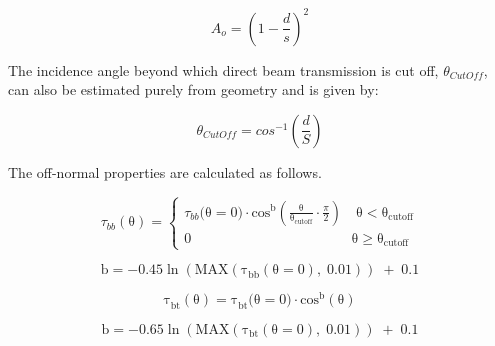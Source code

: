 {\begin{equation}
{A_o} = {\left( {1 - {\frac{d}{s}}} \right)^2}
\end{equation}

The incidence angle beyond which direct beam transmission is cut off, {$\theta$}\(_{CutOff}\), can also be estimated purely from geometry and is given by:

\begin{equation}
{\theta_{CutOff}} = co{s^{ - 1}}\left( {{\frac{d}{S}}} \right)
\end{equation}

The off-normal properties are calculated as follows.

\begin{equation}
{\tau_{bb}}\left( {\mathrm{\theta }} \right) = \left\{ \begin{array}{l}{\tau_{bb}}{\mathrm{(\theta }} = {\mathrm{0)}} \cdot {\mathrm{co}}{{\mathrm{s}}^{\mathrm{b}}}\left( {\frac{{\mathrm{\theta }}}{{{{\mathrm{\theta }}_{{\mathrm{cutoff}}}}}} \cdot \frac{\pi }{{\mathrm{2}}}} \right)\quad {\mathrm{\theta }} < {{\mathrm{\theta }}_{{\mathrm{cutoff}}}}\\0\quad \quad \quad \quad \quad \quad \quad \quad \quad \quad \quad \;\,{\mathrm{\theta }} \ge {{\mathrm{\theta }}_{{\mathrm{cutoff}}}}\end{array} \right.
\end{equation}

\begin{equation}
{\mathrm{b}} =  - {\mathrm{0}}{\mathrm{.45}}\;{\mathrm{ln}}\;\left( {{\mathrm{MAX}}\left( {{{\mathrm{\tau }}_{{\mathrm{bb}}}}\left( {{\mathrm{\theta }} = {\mathrm{0}}} \right){\mathrm{,}}\;{\mathrm{0}}{\mathrm{.01}}} \right)} \right)\; + \;{\mathrm{0}}{\mathrm{.1}}
\end{equation}

\begin{equation}
{\mathrm{\tau }}_{{\mathrm{bt}}}^{}\left( {\mathrm{\theta }} \right) = {\mathrm{\tau }}_{{\mathrm{bt}}}^{}{\mathrm{(\theta }} = {\mathrm{0)}} \cdot {\mathrm{co}}{{\mathrm{s}}^{\mathrm{b}}}\left( {\mathrm{\theta }} \right)
\end{equation}

\begin{equation}
{\mathrm{b}} =  - {\mathrm{0}}{\mathrm{.65}}\;{\mathrm{ln}}\;\left( {{\mathrm{MAX}}\left( {{{\mathrm{\tau }}_{{\mathrm{bt}}}}\left( {{\mathrm{\theta }} = {\mathrm{0}}} \right){\mathrm{,}}\;{\mathrm{0}}{\mathrm{.01}}} \right)} \right)\; + \;{\mathrm{0}}{\mathrm{.1}}
\end{equation}

}
